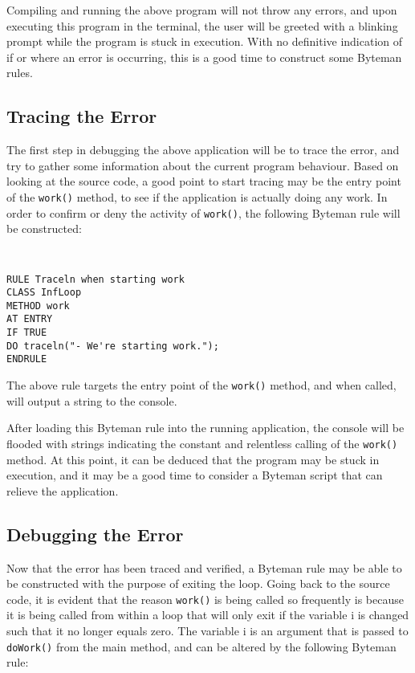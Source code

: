 \documentclass[letterpaper,twocolumn,10pt]{article}
\begin{document}
Compiling and running the above program will not throw any errors, and upon executing this program in the terminal, the user will be greeted with a blinking prompt while the program is stuck in execution. With no definitive indication of if or where an error is occurring, this is a good time to construct some Byteman rules.  

\subsection{Tracing the Error}

The first step in debugging the above application will be to trace the error, and try to gather some information about the current program behaviour. Based on looking at the source code, a good point to start tracing may be the entry point of the {\tt work()} method, to see if the application is actually doing any work. In order to confirm or deny the activity of {\tt work()}, the following Byteman rule will be constructed:

{\tt \small
\begin{verbatim}
RULE Traceln when starting work
CLASS InfLoop
METHOD work
AT ENTRY
IF TRUE
DO traceln("- We're starting work.");
ENDRULE
\end{verbatim}
}

The above rule targets the entry point of the {\tt work()} method, and when called, will output a string to the console. 

After loading this Byteman rule into the running application, the console will be flooded with strings indicating the constant and relentless calling of the {\tt work()} method. At this point, it can be deduced that the program may be stuck in execution, and it may be a good time to consider a Byteman script that can relieve the application.

\subsection{Debugging the Error}

Now that the error has been traced and verified, a Byteman rule may be able to be constructed with the purpose of exiting the loop. Going back to the source code, it is evident that the reason {\tt work()} is being called so frequently is because it is being called from within a loop that will only exit if the variable i is changed such that it no longer equals zero. The variable i is an argument that is passed to {\tt doWork()} from the main method, and can be altered by the following Byteman rule:
\end{document}

